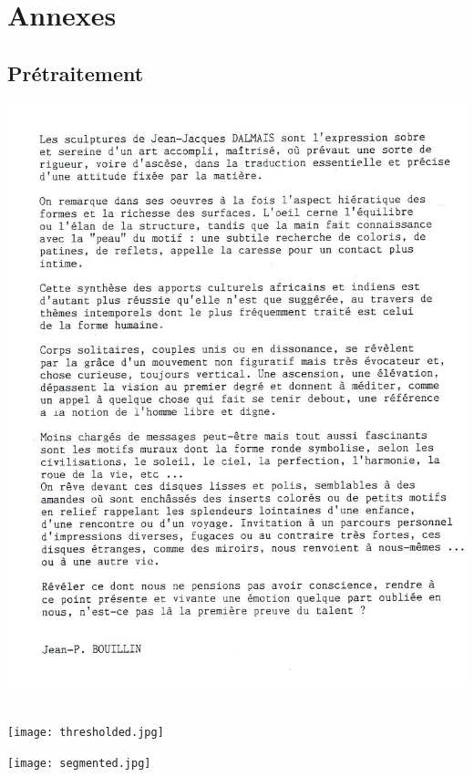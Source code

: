 \documentclass[a4paper,12pt]{report}
\begin{document}








\appendix

\chapter{Annexes} %
\label{cha:annexes}



\section{Pr\'etraitement} %
\label{sec:pr'etraitement}

\begin{center}
\includegraphics[width=160mm]{texte2.jpg}\\
\caption{\emph{Le texte que l'on va traiter}}\\

\texttt{[image: thresholded.jpg]}\\
\caption{\emph{L'image obtenu apr\`es pr\'etraitement}}

\texttt{[image: segmented.jpg]}\\
\caption{\emph{Le texte d\'ecoup\'e en blocs}}
\end{center}
\end{document}
